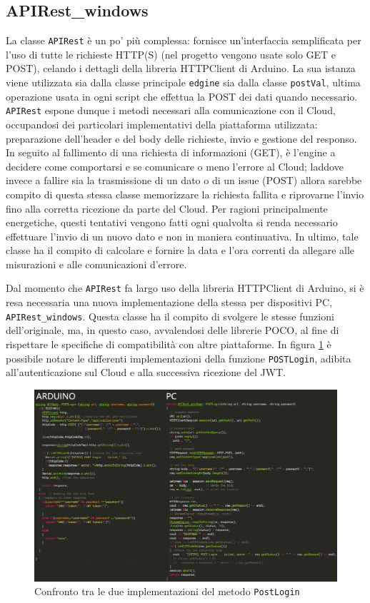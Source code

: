 \subsection{APIRest\_windows}
La classe \texttt{APIRest} è un po' più complessa: fornisce un'interfaccia semplificata per l'uso di tutte le richieste HTTP(S) (nel progetto vengono usate solo GET e POST), celando i dettagli della libreria HTTPClient di Arduino. La sua istanza viene utilizzata sia dalla classe principale \texttt{edgine} sia dalla classe \texttt{postVal}, ultima operazione usata in ogni script che effettua la POST dei dati quando necessario. \texttt{APIRest} espone dunque i metodi necessari alla comunicazione con il Cloud, occupandosi dei particolari implementativi della piattaforma utilizzata: preparazione dell'header e del body delle richieste, invio e gestione del responso. In seguito al fallimento di una richiesta di informazioni (GET), è l'engine a decidere come comportarsi e se comunicare o meno l'errore al Cloud; laddove invece a fallire sia la trasmissione di un dato o di un issue (POST) allora sarebbe compito di questa stessa classe memorizzare la richiesta fallita e riprovarne l'invio fino alla corretta ricezione da parte del Cloud. Per ragioni principalmente energetiche, questi tentativi vengono fatti ogni qualvolta si renda necessario effettuare l'invio di un nuovo dato e non in maniera continuativa. In ultimo, tale classe ha il compito di calcolare e fornire la data e l'ora correnti da allegare alle misurazioni e alle comunicazioni d'errore.

Dal momento che \texttt{APIRest} fa largo uso della libreria HTTPClient di Arduino, si è resa necessaria una nuova implementazione della stessa per dispositivi PC, \texttt{APIRest\_windows}. Questa classe ha il compito di svolgere le stesse funzioni dell’originale, ma, in questo caso, avvalendosi delle librerie POCO, al fine di rispettare le specifiche di compatibilità con altre piattaforme. In figura \ref{APIRestAW} è possibile notare le differenti implementazioni della funzione \texttt{POSTLogin}, adibita all'autenticazione sul Cloud e alla successiva ricezione del JWT.

\begin{figure}[H]
	\centering
	\includegraphics[width=\linewidth]{pics/APIRestAW}
	\caption{Confronto tra le due implementazioni del metodo \texttt{PostLogin}}
	\label{APIRestAW}
\end{figure}
\newpage

